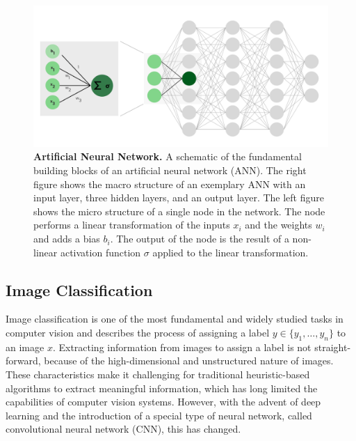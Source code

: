 \documentclass[a4paper]{article}
\begin{document}
\begin{figure}
  \begin{center}
    \includegraphics[width=\textwidth]{./figures/ann.png}
  \end{center}

  \caption{\textbf{Artificial Neural Network.} A schematic of the fundamental
    building blocks of an artificial neural network (ANN). The right figure
    shows the macro structure of an exemplary ANN with an input layer, three
    hidden layers, and an output layer. The left figure shows the micro
    structure of a single node in the network. The node performs a linear
    transformation of the inputs $x_i$ and the weights $w_i$ and adds a bias
    $b_i$. The output of the node is the result of a non-linear activation
    function $\sigma$ applied to the linear transformation.}
  \label{fig:ann}
\end{figure}

\subsection{Image Classification}
\label{sub:image-classification}

Image classification is one of the most fundamental and widely studied tasks in
computer vision and describes the process of assigning a label $y \in \{y_1,
\ldots, y_n\}$ to an image $x$. Extracting information from images to assign a
label is not straight-forward, because of the high-dimensional and unstructured
nature of images. These characteristics make it challenging for traditional
heuristic-based algorithms to extract meaningful information, which has long
limited the capabilities of computer vision systems. However, with the advent of
deep learning and the introduction of a special type of neural network, called
convolutional neural network (CNN), this has changed.
\end{document}
